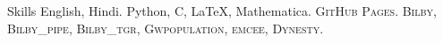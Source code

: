 
\begin{rubric}{Skills}
\entry*[Languages]
	English, Hindi.
	Python, C, \LaTeX, Mathematica.
	\textsc{GitHub Pages}.
\entry*[Packages]
	\textsc{Bilby, Bilby\_pipe, Bilby\_tgr, Gwpopulation, emcee, Dynesty}.
    
\end{rubric}
